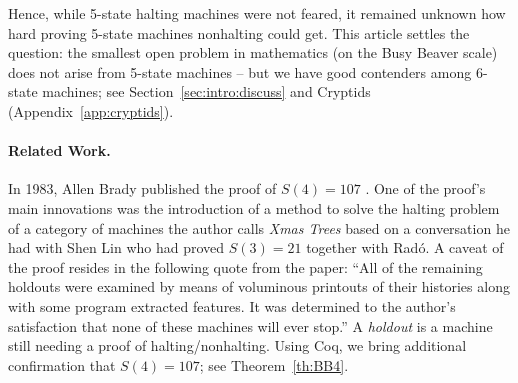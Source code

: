 \documentclass[a4paper,british]{article}
\theoremstyle{definition} %
\numberwithin{equation}{section}
\theoremstyle{definition} %
\newcommand{\ts}[1]{{\color{red}#1}}
\newcommand{\BBtheFourth}{107}
\newcommand{\rado}{Rad\'o\xspace}
\begin{document}
\enlargethispage{\baselineskip}
Hence, while 5-state halting machines were not feared, it remained unknown how hard proving 5-state machines nonhalting could get. This article settles the question: the smallest open problem in mathematics (on the Busy Beaver scale) does not arise from 5-state machines -- but we have good contenders among 6-state machines; see Section~\ref{sec:intro:discuss} and Cryptids (Appendix~\ref{app:cryptids}).

\paragraph{Related Work.} In 1983, Allen Brady published the proof of $S(4) = \BBtheFourth$ \cite{Brady83}. One of the proof's main innovations was the introduction of a method to solve the halting problem of a category of machines the author calls \textit{Xmas Trees} based on a conversation he had with Shen Lin who had proved $S(3) = 21$ together with \rado. A caveat of the proof resides in the following quote from the paper: ``All of the remaining holdouts were examined by means of voluminous printouts of their histories along with some program extracted features. It was determined to the author's satisfaction that none of these machines will ever stop.'' A \textit{holdout} is a machine still needing a proof of halting/nonhalting. Using Coq, we bring additional confirmation that $S(4) = \BBtheFourth$; see Theorem~\ref{th:BB4}.

\newcommand{\SkeletHoldoutsSporadic}{\ts{XX}\xspace}
\end{document}
